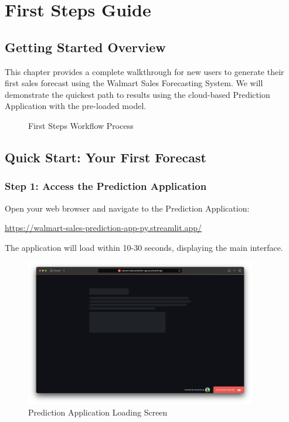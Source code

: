 %
%
%



\chapter{First Steps Guide}

\section{Getting Started Overview}

This chapter provides a complete walkthrough for new users to generate their first sales forecast using the Walmart Sales Forecasting System. We will demonstrate the quickest path to results using the cloud-based Prediction Application with the pre-loaded model.

\begin{figure}[H]
	\centering
	
	\caption{First Steps Workflow Process}
	\label{fig:firstStepsWorkflow}
\end{figure}

\section{Quick Start: Your First Forecast}

\subsection{Step 1: Access the Prediction Application}

Open your web browser and navigate to the Prediction Application:

\url{https://walmart-sales-prediction-app-py.streamlit.app/}

The application will load within 10-30 seconds, displaying the main interface.

\begin{figure}[H]
	\centering
	\includegraphics[width=0.9\textwidth]{Images/03FirstStepsGuide/ApplicationLoading.png}
	\caption{Prediction Application Loading Screen}
	\label{fig:applicationLoading}
\end{figure}

